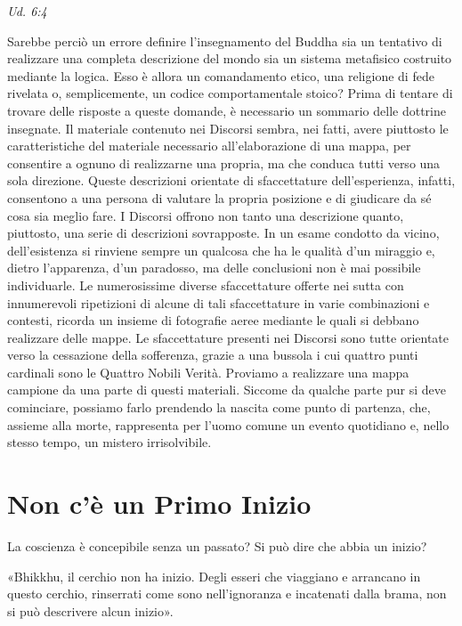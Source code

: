 \emph{Ud. 6:4}


 Sarebbe perciò un errore definire l’insegnamento del
Buddha sia un tentativo di realizzare una completa descrizione del mondo
sia un sistema metafisico costruito mediante la logica. Esso è allora un
comandamento etico, una religione di fede rivelata o, semplicemente, un
codice comportamentale stoico? Prima di tentare di trovare delle
risposte a queste domande, è necessario un sommario delle dottrine
insegnate. Il materiale contenuto nei Discorsi sembra, nei fatti, avere
piuttosto le caratteristiche del materiale necessario all’elaborazione
di una mappa, per consentire a ognuno di realizzarne una propria, ma che
conduca tutti verso una sola direzione. Queste descrizioni orientate di
sfaccettature dell’esperienza, infatti, consentono a una persona di
valutare la propria posizione e di giudicare da sé cosa sia meglio fare.
I Discorsi offrono non tanto una descrizione quanto, piuttosto, una
serie di descrizioni sovrapposte. In un esame condotto da vicino,
dell’esistenza si rinviene sempre un qualcosa che ha le qualità d’un
miraggio e, dietro l’apparenza, d’un paradosso, ma delle conclusioni non
è mai possibile individuarle. Le numerosissime diverse sfaccettature
offerte nei sutta con innumerevoli ripetizioni di alcune di tali
sfaccettature in varie combinazioni e contesti, ricorda un insieme di
fotografie aeree mediante le quali si debbano realizzare delle mappe. Le
sfaccettature presenti nei Discorsi sono tutte orientate verso la
cessazione della sofferenza, grazie a una bussola i cui quattro punti
cardinali sono le Quattro Nobili Verità. Proviamo a realizzare una mappa
campione da una parte di questi materiali. Siccome da qualche parte pur
si deve cominciare, possiamo farlo prendendo la nascita come punto di
partenza, che, assieme alla morte, rappresenta per l’uomo comune un
evento quotidiano e, nello stesso tempo, un mistero irrisolvibile.


\hypertarget{x-non-c’è-un-primo-inizio}{\section*{Non c’è un Primo Inizio}}
 La coscienza è concepibile senza un passato? Si può
dire che abbia un inizio?


 «Bhikkhu, il cerchio non ha inizio. Degli esseri che
viaggiano e arrancano in questo cerchio, rinserrati come sono
nell’ignoranza e incatenati dalla brama, non si può descrivere alcun
inizio».


